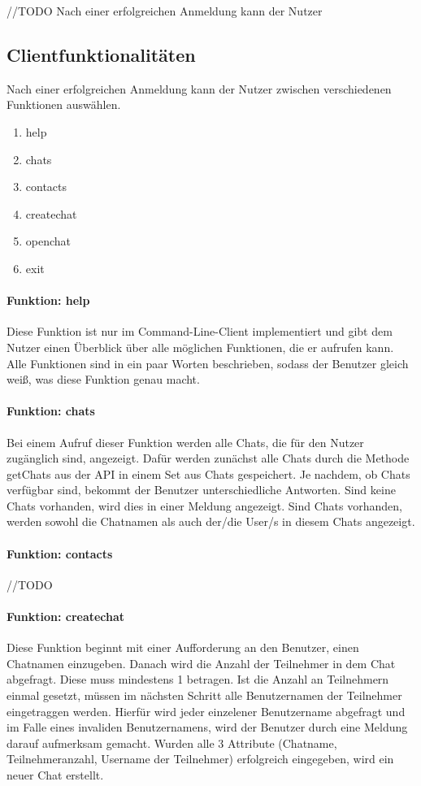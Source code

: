 //TODO Nach einer erfolgreichen Anmeldung kann der Nutzer
\author{Jan Grübener, Troy Keßler, Patrick Mischka, Michael Angermeier}
\subsection{Clientfunktionalitäten}
Nach einer erfolgreichen Anmeldung kann der Nutzer zwischen verschiedenen Funktionen auswählen.
\begin{enumerate}
    \item help
    \item chats
    \item contacts
    \item createchat
    \item openchat
    \item exit
\end{enumerate}
\paragraph{Funktion: help}
Diese Funktion ist nur im Command-Line-Client implementiert und gibt dem Nutzer einen Überblick
über alle möglichen Funktionen, die er aufrufen kann. Alle Funktionen sind in ein paar Worten beschrieben,
sodass der Benutzer gleich weiß, was diese Funktion genau macht.
\paragraph{Funktion: chats}
Bei einem Aufruf dieser Funktion werden alle Chats, die für den Nutzer zugänglich sind, angezeigt.
Dafür werden zunächst alle Chats durch die Methode getChats aus der API in einem Set aus Chats gespeichert.
Je nachdem, ob Chats verfügbar sind, bekommt der Benutzer unterschiedliche Antworten.
Sind keine Chats vorhanden, wird dies in einer Meldung angezeigt.
Sind Chats vorhanden, werden sowohl die Chatnamen als auch der/die User/s in diesem Chats angezeigt.
\paragraph{Funktion: contacts}
//TODO
\paragraph{Funktion: createchat}
Diese Funktion beginnt mit einer Aufforderung an den Benutzer, einen Chatnamen einzugeben.
Danach wird die Anzahl der Teilnehmer in dem Chat abgefragt. Diese muss mindestens 1 betragen.
Ist die Anzahl an Teilnehmern einmal gesetzt, müssen im nächsten Schritt alle Benutzernamen
der Teilnehmer eingetraggen werden. Hierfür wird jeder einzelener Benutzername abgefragt und
im Falle eines invaliden Benutzernamens, wird der Benutzer durch eine Meldung darauf aufmerksam gemacht.
Wurden alle 3 Attribute (Chatname, Teilnehmeranzahl, Username der Teilnehmer) erfolgreich eingegeben,
wird ein neuer Chat erstellt.
